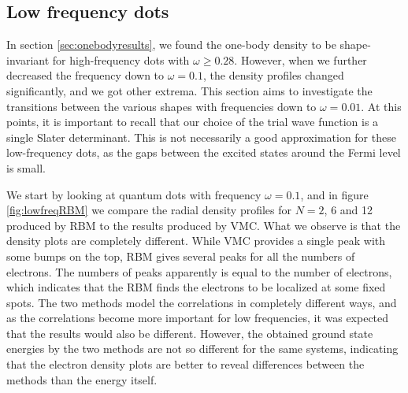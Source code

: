 \subsection{Low frequency dots} \label{sec:lowfrequencies}
In section \ref{sec:onebodyresults}, we found the one-body density to be shape-invariant for high-frequency dots with $\omega\geq0.28$. However, when we further decreased the frequency down to $\omega=0.1$, the density profiles changed significantly, and we got other extrema. This section aims to investigate the transitions between the various shapes with frequencies down to $\omega=0.01$. At this points, it is important to recall that our choice of the trial wave function is a single Slater determinant. This is not necessarily a good approximation for these low-frequency dots, as the gaps between the excited states around the Fermi level is small. 

We start by looking at quantum dots with frequency $\omega=0.1$, and in figure \eqref{fig:lowfreqRBM} we compare the radial density profiles for $N=2$, 6 and 12 produced by RBM to the results produced by VMC. What we observe is that the density plots are completely different. While VMC provides a single peak with some bumps on the top, RBM gives several peaks for all the numbers of electrons. The numbers of peaks apparently is equal to the number of electrons, which indicates that the RBM finds the electrons to be localized at some fixed spots. The two methods model the correlations in completely different ways, and as the correlations become more important for low frequencies, it was expected that the results would also be different. However, the obtained ground state energies by the two methods are not so different for the same systems, indicating that the electron density plots are better to reveal differences between the methods than the energy itself. 

